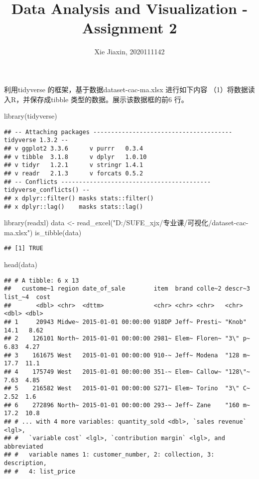 \documentclass[
]{article}
\title{Data Analysis and Visualization - Assignment 2}
\author{Xie Jiaxin, 2020111142}
\date{}
\newenvironment{Shaded}{\begin{snugshade}}{\end{snugshade}}
\newcommand{\FunctionTok}[1]{\textcolor[rgb]{0.00,0.00,0.00}{#1}}
\newcommand{\NormalTok}[1]{#1}
\newcommand{\OtherTok}[1]{\textcolor[rgb]{0.56,0.35,0.01}{#1}}
\newcommand{\StringTok}[1]{\textcolor[rgb]{0.31,0.60,0.02}{#1}}
\begin{document}
\maketitle

利⽤tidyverse 的框架，基于数据dataset-cac-ma.xlsx 进⾏如下内容
（1）将数据读入R，并保存成tibble 类型的数据。展⽰该数据框的前6 ⾏。

\begin{Shaded}
\begin{Highlighting}[]
\FunctionTok{library}\NormalTok{(tidyverse)}
\end{Highlighting}
\end{Shaded}

\begin{verbatim}
## -- Attaching packages --------------------------------------- tidyverse 1.3.2 --
## v ggplot2 3.3.6      v purrr   0.3.4 
## v tibble  3.1.8      v dplyr   1.0.10
## v tidyr   1.2.1      v stringr 1.4.1 
## v readr   2.1.3      v forcats 0.5.2 
## -- Conflicts ------------------------------------------ tidyverse_conflicts() --
## x dplyr::filter() masks stats::filter()
## x dplyr::lag()    masks stats::lag()
\end{verbatim}

\begin{Shaded}
\begin{Highlighting}[]
\FunctionTok{library}\NormalTok{(readxl)}
\NormalTok{data }\OtherTok{\textless{}{-}} \FunctionTok{read\_excel}\NormalTok{(}\StringTok{"D:/SUFE\_xjx/专业课/可视化/dataset{-}cac{-}ma.xlsx"}\NormalTok{)}
\FunctionTok{is\_tibble}\NormalTok{(data)}
\end{Highlighting}
\end{Shaded}

\begin{verbatim}
## [1] TRUE
\end{verbatim}

\begin{Shaded}
\begin{Highlighting}[]
\FunctionTok{head}\NormalTok{(data)}
\end{Highlighting}
\end{Shaded}

\begin{verbatim}
## # A tibble: 6 x 13
##   custome~1 region date_of_sale        item  brand colle~2 descr~3 list_~4  cost
##       <dbl> <chr>  <dttm>              <chr> <chr> <chr>   <chr>     <dbl> <dbl>
## 1     20943 Midwe~ 2015-01-01 00:00:00 918DP Jeff~ Presti~ "Knob"    14.1   8.62
## 2    126101 North~ 2015-01-01 00:00:00 2981~ Elem~ Floren~ "3\" p~    6.83  4.27
## 3    161675 West   2015-01-01 00:00:00 910-~ Jeff~ Modena  "128 m~   17.7  11.1 
## 4    175749 West   2015-01-01 00:00:00 351-~ Elem~ Callow~ "128\"~    7.63  4.85
## 5    216582 West   2015-01-01 00:00:00 S271~ Elem~ Torino  "3\" C~    2.52  1.6 
## 6    272896 North~ 2015-01-01 00:00:00 293-~ Jeff~ Zane    "160 m~   17.2  10.8 
## # ... with 4 more variables: quantity_sold <dbl>, `sales revenue` <lgl>,
## #   `variable cost` <lgl>, `contribution margin` <lgl>, and abbreviated
## #   variable names 1: customer_number, 2: collection, 3: description,
## #   4: list_price
\end{verbatim}
\end{document}
